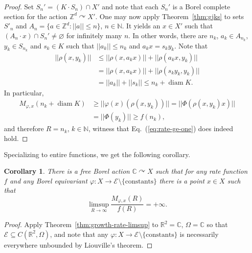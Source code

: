 \documentclass[12pt]{paper}
\numberwithin{equation}{section}
\theoremstyle{plain}
\newtheorem{corollary}[theorem]{Corollary}
\theoremstyle{definition}
\newcommand{\C}{\mathbb{C}}
\newcommand{\N}{\mathbb{N}}
\newcommand{\R}{\mathbb{R}}
\newcommand{\Zd}{\mathbb{Z}^{d}}
\newcommand{\holom}[1][]{\mathcal{E}_{#1}}
\DeclareMathOperator*{\diam}{\mathrm{diam}}
\newcommand{\acts}{\curvearrowright}
\newcommand{\norm}[1]{||#1||}
\renewcommand{\phi}{\varphi}
\begin{document}
\begin{proof}
  Set \(S_{n}' = (K \cdot S_{n}) \cap X'\) and note that each \(S_{n}'\) is a Borel complete section
  for the action \(\Zd \acts X'\).  One may now apply Theorem~\ref{thm:gjks} to sets \(S'_{n}\) and
  \(A_{n} = \{ a \in \Zd : \norm{a} \le n\}\), \(n \in \N\). It yields an \(x \in X'\) such that
  \((A_{n} \cdot x ) \cap S_{n}' \ne \varnothing\) for infinitely many \(n\).  In other words, there
  are \(n_{k}\), \(a_{k} \in A_{n_{k}}\), \(y_{k}\in S_{n_{k}}\) and \(s_{k} \in K\) such that
  \(\norm{a_{k}} \le n_{k}\) and \(a_{k}x = s_{k}y_{k}\).  Note that
  \begin{displaymath}
    \begin{aligned}
      \norm{\rho(x, y_{k})}
      &\le \norm{\rho(x,a_{k}x)} + \norm{\rho(a_{k}x, y_{k})} \\
      &= \norm{\rho(x,a_{k}x)} + \norm{\rho(s_{k}y_{k}, y_{k})} \\
      &= \norm{a_{k}} + \norm{s_{k}} \le n_{k} + \diam K.
    \end{aligned}
  \end{displaymath}
  In particular,
  \begin{displaymath}
    \begin{aligned}
      M_{\phi, x}(n_{k} + \diam K) &\ge \norm{\phi(x)(\rho(x,y_{k}))}
                                     = \norm{\Phi(\rho(x,y_{k})x)} \\
                                   &=
                                     \norm{\Phi(y_{k})} \ge f(n_{k}),
    \end{aligned}
  \end{displaymath}
  and therefore \(R = n_{k}\), \(k \in \N\), witness that Eq.~(\ref{eq:rate-ge-one}) does indeed
  hold.
\end{proof}

Specializing to entire functions, we get the following corollary.

\begin{corollary}
  \label{cor:borel-entire-unbounded-growth}
  There is a free Borel action \(\C \acts X\) such that for any rate function \(f\) and any Borel
  equivariant \(\phi : X \to \holom \setminus \{\textrm{constants}\}\) there is a point \(x \in X\)
  such that
  \[\limsup_{R \to \infty} \dfrac{M_{\phi, x}(R)}{f(R)} = +\infty.\]
\end{corollary}

\begin{proof}
  Apply Theorem~\ref{thm:growth-rate-limsup} to \(\R^{2} = \C\), \(\Omega = \C\) so that
  \(\holom \subseteq C(\R^{2}, \Omega)\), and note that any
  \(\phi: X \to \holom \setminus \{\textrm{constants}\}\) is necessarily everywhere unbounded by
  Liouville's theorem.
\end{proof}
\end{document}
